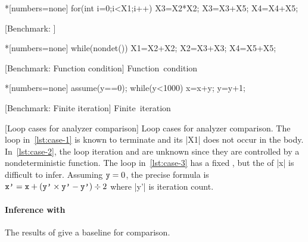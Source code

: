 \begin{center}
\captionsetup{type=figure}
\begin{minipage}{\textwidth}
\begin{minipage}[t]{.33\textwidth}
\begin{implisting}*[numbers=none]
for(int i=0;i<X1;i++)
{ X3=X2*X2;
  X3=X3+X5;
  X4=X4+X5; }
\end{implisting}
[Benchmark: \explain]{\mbox{\explain}}
\label{lst:case-1}
\end{minipage}\hfill%
\begin{minipage}[t]{.33\textwidth}
\begin{implisting}*[numbers=none]
while(nondet())
{ X1=X2+X2;
  X2=X3+X3;
  X4=X5+X5; }
\end{implisting}
[Benchmark: Function condition]
{\mbox{Function condition}}
\label{lst:case-2}
\end{minipage}\hfill%
\begin{minipage}[t]{.3\textwidth}
\begin{implisting}*[numbers=none]
assume(y==0);
while(y<1000)
{ x=x+y;
  y=y+1; }
\end{implisting}
[Benchmark: Finite iteration]
{\mbox{Finite iteration}}
\label{lst:case-3}
\end{minipage}
\end{minipage}
[Loop cases for analyzer comparison]{
Loop cases for analyzer comparison. The loop in~\ref{lst:case-1} is known to
terminate and its  \pr|X1| does not occur in the body.
In~\ref{lst:case-2}, the loop iteration and  are unknown since
they are controlled by a nondeterministic function. The
loop in~\ref{lst:case-3} has a fixed , but the
 of \pr|x| is difficult to infer. Assuming \(\prm{y}=0\), the
precise formula is \(\prm{x'} = \prm{x} + (\prm{y'} \times \prm{y'} - \prm{y'})
\div 2\) where \pr|y'| is iteration count.
}\label{fig:loops}
\end{center}

\paragraph*{Inference with \impl}
The results of \ndx{\impl} give a baseline for comparison.

